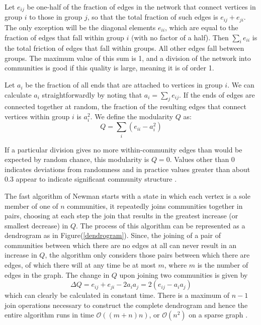 Let $e_{ij}$ be one-half of the fraction of edges in the network that connect vertices in group $i$ to those in group $j$, so that the total fraction of such edges is $e_{ij} + e_{ji}$. The only exception will be the diagonal elements $e_{ii}$, which are equal to the fraction of edges that fall within group $i$ (with no factor of a half). Then $\sum_i e_{ii}$ is the total friction of edges that fall within groups. All other edges fall between groups. The maximum value of this sum is 1, and  a division of the network into communities is good if this quality is large, meaning it is of order 1.

Let $a_i$ be the fraction of all ends that are attached to vertices in group $i$. We can calculate $a_i$ straightforwardly by noting that $a_i = \sum_j e_{ij}$. If the ends of edges are connected together at random, the fraction of the resulting edges that connect vertices within group $i$ is $a_i^2$. We define the modularity $Q$ as:
\begin{equation}
Q = \sum\limits_i (e_{ii} - a_i^2)
\end{equation}

If a particular division gives no more within-community edges than would be expected by random chance, this modularity is $Q = 0$. Values other than 0 indicates deviations from randomness and in practice values greater than about 0.3 appear to indicate significant community structure \cite{ref-12}.

The fast algorithm of Newman starts with a state in which each vertex is a sole member of one of $n$ communities, it repeatedly joins communities together in pairs, choosing at each step the  join that results in the greatest increase (or smallest decrease) in $Q$. The process of this algorithm can be represented as a dendrogram as in Figure(\ref{dendrogram}). Since, the joining of a pair of communities between which there are no edges at all can never result in an increase in $Q$, the algorithm only considers those pairs between which there are edges, of which there will at any time be at most $m$, where $m$ is the number of edges in the graph. The change in $Q$ upon joining two communities is given by
\begin{equation}
\Delta Q = e_{ij} + e_{ji} - 2 a_i a_j = 2(e_{ij} - a_ia_j)
\end{equation}
which can clearly be calculated in constant time. There is a maximum of $n - 1$ join operations necessary to construct the complete dendrogram and hence the entire algorithm runs in time $\mathcal{O}((m + n)n)$, or $\mathcal{O}(n^2)$ on a sparse graph \cite{ref-13}.

